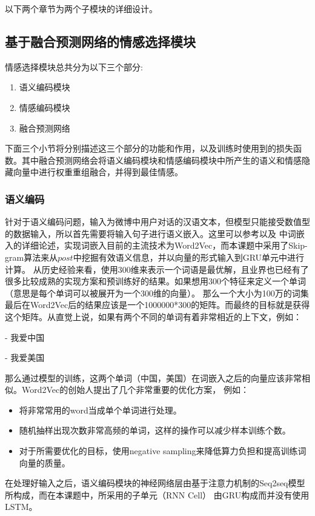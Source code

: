 \documentclass[supercite]{HustGraduPaper}
\theoremstyle{definition}
\begin{document}
以下两个章节为两个子模块的详细设计。

\subsection{基于融合预测网络的情感选择模块}
情感选择模块总共分为以下三个部分:
\begin{enumerate}
  \item 语义编码模块
  \item 情感编码模块
  \item 融合预测网络
\end{enumerate} 
下面三个小节将分别描述这三个部分的功能和作用，以及训练时使用到的损失函数。其中融合预测网络会将语义编码模块和情感编码模块中所产生的语义和情感隐藏向量中进行权重重组融合，并得到最佳情感。

\subsubsection{语义编码}
针对于语义编码问题，输入为微博中用户对话的汉语文本，但模型只能接受数值型的数据输入，所以首先需要将输入句子进行语义嵌入。这里可以参考\cite{mikolov2013efficient}以及
\cite{wordvector}中词嵌入的详细论述，实现词嵌入目前的主流技术为Word2Vec，而本课题中采用了Skip-gram算法来从$post$中挖掘有效语义信息，并以向量的形式输入到GRU单元中进行计算。
从历史经验来看，使用300维来表示一个词语是最优解，且业界也已经有了很多比较成熟的实现方案和预训练好的结果。如果想用300个特征来定义一个单词（意思是每个单词可以被展开为一个300维的向量）。
那么一个大小为100万的词集最后在Word2Vec后的结果应该是一个1000000*300的矩阵。而最终的目标就是获得这个矩阵。从直觉上说，如果有两个不同的单词有着非常相近的上下文，例如：
\begin{shaded*}
  - 我爱中国

  - 我爱美国
\end{shaded*}


那么通过模型的训练，这两个单词（中国，美国）在词嵌入之后的向量应该非常相似。Word2Vec的创始人提出了几个非常重要的优化方案，
例如：
\begin{itemize}
  \item 将非常常用的word当成单个单词进行处理。
  \item 随机抽样出现次数非常高频的单词，这样的操作可以减少样本训练个数。
  \item 对于所需要优化的目标，使用negative sampling来降低算力负担和提高训练词向量的质量。
\end{itemize}


在处理好输入之后，语义编码模块的神经网络层由基于注意力机制的Seq2seq模型所构成，而在本课题中，所采用的子单元（RNN Cell）
由GRU构成而并没有使用LSTM。
\end{document}
